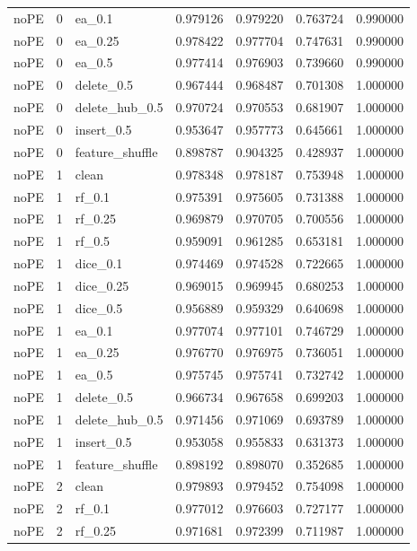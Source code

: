 \documentclass[UTF8,a4paper,11pt,fontset=fandol]{ctexart}
\begin{document}
{\begin{longtable}{lrlrrrr}
noPE & 0 & ea\_0.1 & 0.979126 & 0.979220 & 0.763724 & 0.990000 \\
noPE & 0 & ea\_0.25 & 0.978422 & 0.977704 & 0.747631 & 0.990000 \\
noPE & 0 & ea\_0.5 & 0.977414 & 0.976903 & 0.739660 & 0.990000 \\
noPE & 0 & delete\_0.5 & 0.967444 & 0.968487 & 0.701308 & 1.000000 \\
noPE & 0 & delete\_hub\_0.5 & 0.970724 & 0.970553 & 0.681907 & 1.000000 \\
noPE & 0 & insert\_0.5 & 0.953647 & 0.957773 & 0.645661 & 1.000000 \\
noPE & 0 & feature\_shuffle & 0.898787 & 0.904325 & 0.428937 & 1.000000 \\
noPE & 1 & clean & 0.978348 & 0.978187 & 0.753948 & 1.000000 \\
noPE & 1 & rf\_0.1 & 0.975391 & 0.975605 & 0.731388 & 1.000000 \\
noPE & 1 & rf\_0.25 & 0.969879 & 0.970705 & 0.700556 & 1.000000 \\
noPE & 1 & rf\_0.5 & 0.959091 & 0.961285 & 0.653181 & 1.000000 \\
noPE & 1 & dice\_0.1 & 0.974469 & 0.974528 & 0.722665 & 1.000000 \\
noPE & 1 & dice\_0.25 & 0.969015 & 0.969945 & 0.680253 & 1.000000 \\
noPE & 1 & dice\_0.5 & 0.956889 & 0.959329 & 0.640698 & 1.000000 \\
noPE & 1 & ea\_0.1 & 0.977074 & 0.977101 & 0.746729 & 1.000000 \\
noPE & 1 & ea\_0.25 & 0.976770 & 0.976975 & 0.736051 & 1.000000 \\
noPE & 1 & ea\_0.5 & 0.975745 & 0.975741 & 0.732742 & 1.000000 \\
noPE & 1 & delete\_0.5 & 0.966734 & 0.967658 & 0.699203 & 1.000000 \\
noPE & 1 & delete\_hub\_0.5 & 0.971456 & 0.971069 & 0.693789 & 1.000000 \\
noPE & 1 & insert\_0.5 & 0.953058 & 0.955833 & 0.631373 & 1.000000 \\
noPE & 1 & feature\_shuffle & 0.898192 & 0.898070 & 0.352685 & 1.000000 \\
noPE & 2 & clean & 0.979893 & 0.979452 & 0.754098 & 1.000000 \\
noPE & 2 & rf\_0.1 & 0.977012 & 0.976603 & 0.727177 & 1.000000 \\
noPE & 2 & rf\_0.25 & 0.971681 & 0.972399 & 0.711987 & 1.000000 \\

\end{longtable}}
\end{document}
